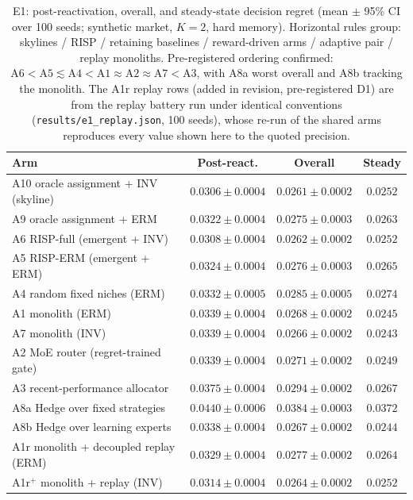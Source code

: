 \documentclass{article}
\newcommand{\nm}{\textsc{RISP}}
\begin{document}
\begin{table}[t]
\centering
\small
\caption{E1: post-reactivation, overall, and steady-state decision regret
(mean $\pm$ 95\% CI over 100 seeds; synthetic market, $K{=}2$, hard memory).
Horizontal rules group: skylines / \nm{} / retaining baselines /
reward-driven arms / adaptive pair / replay monoliths. Pre-registered ordering confirmed:
$\text{A6} < \text{A5} \lesssim \text{A4} < \text{A1} \approx \text{A2}
\approx \text{A7} < \text{A3}$, with A8a worst overall and A8b tracking the
monolith. The A1r replay rows (added in revision, pre-registered D1) are
from the replay battery run under identical conventions
(\texttt{results/e1\_replay.json}, 100 seeds), whose re-run of the shared
arms reproduces every value shown here to the quoted precision.}
\label{tab:e1}
\begin{tabular}{lccc}
\toprule
\textbf{Arm} & \textbf{Post-react.} & \textbf{Overall} & \textbf{Steady} \\
\midrule
A10 oracle assignment + INV (skyline) & $0.0306 \pm 0.0004$ & $0.0261 \pm 0.0002$ & $0.0252$ \\
A9 \phantom{0}oracle assignment + ERM & $0.0322 \pm 0.0004$ & $0.0275 \pm 0.0003$ & $0.0263$ \\
\midrule
\rowcolor{blue!6}
A6 \phantom{0}\nm{}-full (emergent + INV) & $\mathbf{0.0308 \pm 0.0004}$ & $0.0262 \pm 0.0002$ & $0.0252$ \\
A5 \phantom{0}\nm{}-ERM (emergent + ERM) & $0.0324 \pm 0.0004$ & $0.0276 \pm 0.0003$ & $0.0265$ \\
\midrule
A4 \phantom{0}random fixed niches (ERM) & $0.0332 \pm 0.0005$ & $0.0285 \pm 0.0005$ & $0.0274$ \\
\midrule
A1 \phantom{0}monolith (ERM) & $0.0339 \pm 0.0004$ & $0.0268 \pm 0.0002$ & $0.0245$ \\
A7 \phantom{0}monolith (INV) & $0.0339 \pm 0.0004$ & $0.0266 \pm 0.0002$ & $0.0243$ \\
A2 \phantom{0}MoE router (regret-trained gate) & $0.0339 \pm 0.0004$ & $0.0271 \pm 0.0002$ & $0.0249$ \\
A3 \phantom{0}recent-performance allocator & $0.0375 \pm 0.0004$ & $0.0294 \pm 0.0002$ & $0.0267$ \\
\midrule
A8a Hedge over fixed strategies & $0.0440 \pm 0.0006$ & $0.0384 \pm 0.0003$ & $0.0372$ \\
A8b Hedge over learning experts & $0.0338 \pm 0.0004$ & $0.0267 \pm 0.0002$ & $0.0244$ \\
\midrule
A1r monolith + decoupled replay (ERM) & $0.0329 \pm 0.0004$ & $0.0277 \pm 0.0002$ & $0.0264$ \\
A1r$^{+}$ monolith + replay (INV) & $0.0314 \pm 0.0004$ & $0.0264 \pm 0.0002$ & $0.0252$ \\
\bottomrule
\end{tabular}
\end{table}
\end{document}

